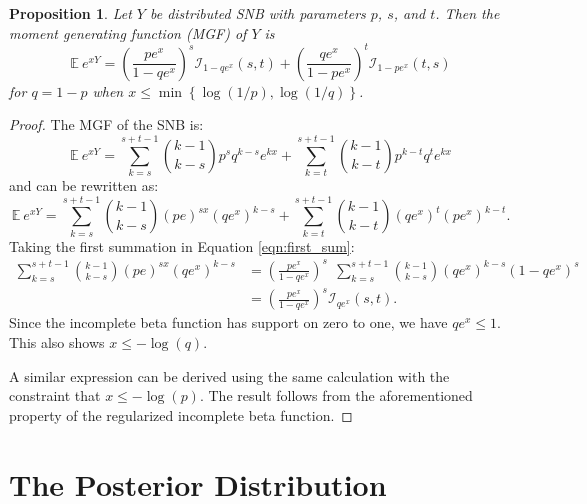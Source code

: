\documentclass[review]{elsarticle}
\newtheorem{prop}{Proposition}
\begin{document}
\begin{prop} Let $Y$ be distributed SNB with parameters $p$, $s$, and $t$.
Then the moment generating function (MGF) of $Y$ is
\begin{equation} \label{eqn:mgf}
\mathbb{E}~e^{xY} = \left(\frac{p e^x}{1 - qe^x}\right)^s 
  \mathcal{I}_{1-qe^x} (s, t) + \left(\frac{qe^x}{1-pe^x}\right)^t 
  \mathcal{I}_{1-pe^x}(t, s)
\end{equation}
for $q = 1-p$ when $x \leq \min \left\{\log(1/p), \log(1/q) \right\}$.
\end{prop}
\begin{proof}
The MGF of the SNB is:
\begin{equation*}
\mathbb{E}~e^{xY} = \sum_{k=s}^{s+t-1} {k-1 \choose k-s} p^s q^{k-s} e^{kx} 
  + \sum_{k=t}^{s+t-1} {k-1 \choose k-t} p^{k-t} q^t e^{kx}
\end{equation*}
and can be rewritten as:
\begin{equation} \label{eqn:first_sum}
\mathbb{E}~e^{xY} = \sum_{k=s}^{s+t-1}{k-1 \choose k-s} (pe)^{sx} (qe^x)^{k-s} 
  + \sum_{k=t}^{s+t-1}{k-1 \choose k-t} (qe^x)^t (pe^x)^{k-t}.
\end{equation}
Taking the first summation in Equation \ref{eqn:first_sum}:
\begin{align*}
\sum_{k=s}^{s+t-1}{k-1 \choose k-s} (pe)^{sx} (qe^x)^{k-s} &= 
  \left(\frac{pe^x}{1 - qe^x}\right)^s \ \ \sum_{k=s}^{s+t-1} {k-1 \choose k-s} 
    (qe^x)^{k-s} (1-qe^x)^s \\
  &= \left(\frac{pe^x}{1 - qe^x}\right)^s \mathcal{I}_{qe^x}(s, t).
\end{align*}
Since the incomplete beta function has support on zero to one, we have
$qe^x \leq 1$. This also shows $x \leq -\log(q)$.

A similar expression can be derived using the same calculation with
the constraint that $x \leq -\log(p)$. The result
follows from the aforementioned property of the regularized incomplete
beta function.
\end{proof}

\section{The Posterior Distribution}
\end{document}
